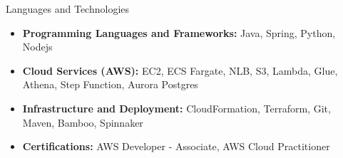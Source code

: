 \documentclass[]{mcdowellcv}
\begin{document}
    \makeheader

    \begin{cvsection}{Languages and Technologies}
        \begin{cvsubsection}{}{}{}
            \begin{itemize}
                \item \textbf {Programming Languages and Frameworks:} Java, Spring, Python, Nodejs
                \item \textbf {Cloud Services (AWS):} EC2, ECS Fargate, NLB, S3, Lambda, Glue, Athena, Step Function, Aurora Postgres
                \item \textbf {Infrastructure and Deployment:} CloudFormation, Terraform, Git, Maven, Bamboo, Spinnaker
                \item \textbf {Certifications:} AWS Developer - Associate, AWS Cloud Practitioner
            \end{itemize}
        \end{cvsubsection}
    \end{cvsection}
\end{document}
